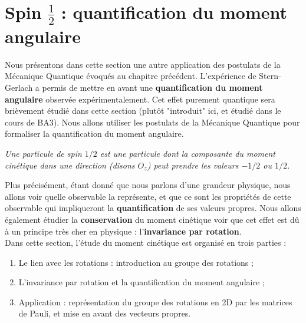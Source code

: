 \documentclass[../notesdecours.tex]{subfiles}
\begin{document}
\section{Spin $\frac{1}{2}$ : quantification du moment angulaire}
Nous présentons dans cette section une autre application des postulats de la Mécanique Quantique évoqués au chapitre précédent. L'expérience de Stern-Gerlach a permis de mettre en avant une \textbf{quantification du moment angulaire} observée expérimentalement. Cet effet purement quantique sera brièvement étudié dans cette section (plutôt "introduit" ici, et étudié dans le cours de BA3). Nous allons utiliser les postulats de la Mécanique Quantique pour formaliser la quantification du moment angulaire. \\

\begin{leftbar}
    \textit{Une particule de spin $1/2$ est une particule dont la composante du moment cinétique dans une direction (disons $O_z$) peut prendre les valeurs $-1/2$ ou $1/2$. }
\end{leftbar}

Plus précisément, étant donné que nous parlons d'une grandeur physique, nous allons voir quelle observable la représente, et que ce sont les propriétés de cette observable qui impliqueront la \textbf{quantification} de ses valeurs propres. Nous allons également étudier la \textbf{conservation} du moment cinétique voir que cet effet est dû à un principe très cher en physique : l'\textbf{invariance par rotation}. \\

Dans cette section, l'étude du moment cinétique est organisé en trois parties :
\begin{enumerate}
    \item Le lien avec les rotations : introduction au groupe des rotations ;
    \item L'invariance par rotation et la quantification du moment angulaire ;
    \item Application : représentation du groupe des rotations en 2D par les matrices de Pauli, et mise en avant des vecteurs propres.
\end{enumerate} 
\end{document}
